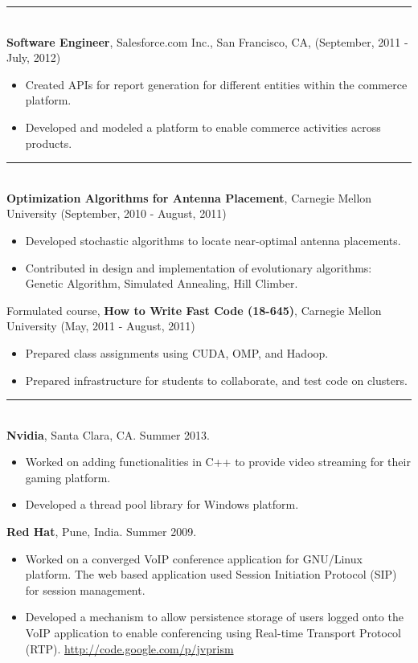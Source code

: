 \documentclass[a4paper,oneside,english]{article}
\begin{document}
\textit{ }
\noindent\rule{6in}{0.4pt} \\[4pt]
 \textbf{Software Engineer}, Salesforce.com Inc., San Francisco, CA, (September, 2011 - July, 2012)
\begin{itemize}
	\itemsep0em
	\item Created APIs for report generation for different entities within the commerce platform. 
	\item Developed and modeled a platform to enable commerce activities across products.
\end{itemize}
\noindent\rule{6in}{0.4pt} \\[4pt]
 \textbf{Optimization Algorithms for Antenna Placement}, Carnegie Mellon University (September, 2010 - August, 2011) 
\begin{itemize}
	\itemsep0em
	\item Developed stochastic algorithms to locate near-optimal antenna placements.
	\item Contributed in design and implementation of evolutionary algorithms: Genetic Algorithm, Simulated Annealing, Hill Climber.
\end{itemize} \vspace*{2mm}
Formulated course, \textbf{How to Write Fast Code (18-645)}, Carnegie Mellon University (May, 2011 - August, 2011) 
\begin{itemize}
	\itemsep0em
	\item Prepared class assignments using CUDA, OMP, and Hadoop.
	\item Prepared infrastructure for students to collaborate, and test code on clusters.
\end{itemize}
\noindent\rule{6in}{0.4pt} \\[4pt]
 \textbf{Nvidia}, Santa Clara, CA. Summer 2013. 
\begin{itemize}
	\itemsep0em
	\item Worked on adding functionalities in C++ to provide video streaming for their gaming platform. 
	\item Developed a thread pool library for Windows platform. 
\end{itemize} \vspace*{2mm}
\noindent\textbf{Red Hat}, Pune, India. Summer 2009.
\begin{itemize}
	\itemsep0em
	\item Worked on a converged VoIP conference application for GNU/Linux platform. The web based application used Session Initiation Protocol (SIP) for session management. 
	\item Developed a mechanism to allow persistence storage of users logged onto the VoIP application to enable conferencing using Real-time Transport Protocol (RTP). \url{http://code.google.com/p/jvprism}
\end{itemize}
\end{document}
